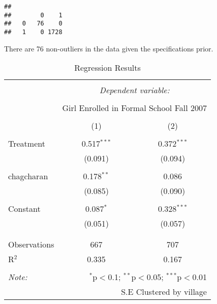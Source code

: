 \documentclass[
]{article}
\newenvironment{Shaded}{\begin{snugshade}}{\end{snugshade}}
\newcommand{\FunctionTok}[1]{\textcolor[rgb]{0.00,0.00,0.00}{#1}}
\newcommand{\NormalTok}[1]{#1}
\newcommand{\OtherTok}[1]{\textcolor[rgb]{0.56,0.35,0.01}{#1}}
\newcommand{\SpecialCharTok}[1]{\textcolor[rgb]{0.00,0.00,0.00}{#1}}
\begin{document}
\begin{Shaded}
\end{Shaded}

\begin{verbatim}
##    
##        0    1
##   0   76    0
##   1    0 1728
\end{verbatim}

There are 76 non-outliers in the data given the specifications prior.

\begin{table}[!htbp] \centering 
  \caption{Regression Results} 
  \label{} 
\begin{tabular}{@{\extracolsep{5pt}}lcc} 
\\[-1.8ex]\hline 
\hline \\[-1.8ex] 
 & \multicolumn{2}{c}{\textit{Dependent variable:}} \\ 
\cline{2-3} 
\\[-1.8ex] & \multicolumn{2}{c}{Girl Enrolled in Formal School Fall 2007} \\ 
\\[-1.8ex] & (1) & (2)\\ 
\hline \\[-1.8ex] 
 Treatment & 0.517$^{***}$ & 0.372$^{***}$ \\ 
  & (0.091) & (0.094) \\ 
  & & \\ 
 chagcharan & 0.178$^{**}$ & 0.086 \\ 
  & (0.085) & (0.090) \\ 
  & & \\ 
 Constant & 0.087$^{*}$ & 0.328$^{***}$ \\ 
  & (0.051) & (0.057) \\ 
  & & \\ 
\hline \\[-1.8ex] 
Observations & 667 & 707 \\ 
R$^{2}$ & 0.335 & 0.167 \\ 
\hline 
\hline \\[-1.8ex] 
\textit{Note:}  & \multicolumn{2}{r}{$^{*}$p$<$0.1; $^{**}$p$<$0.05; $^{***}$p$<$0.01} \\ 
 & \multicolumn{2}{r}{S.E Clustered by village} \\ 
\end{tabular} 
\end{table}
\end{document}
